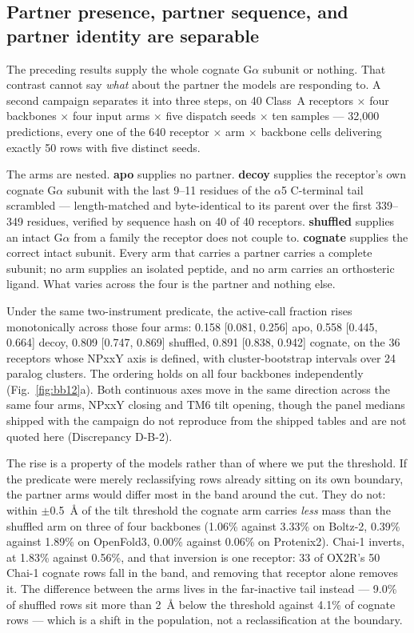\subsection*{Partner presence, partner sequence, and partner identity are separable}

The preceding results supply the whole cognate G$\alpha$ subunit or nothing. That
contrast cannot say \emph{what} about the partner the models are responding to.
A second campaign separates it into three steps, on 40 Class~A receptors $\times$
four backbones $\times$ four input arms $\times$ five dispatch seeds $\times$ ten
samples --- 32{,}000 predictions, every one of the 640 receptor $\times$ arm
$\times$ backbone cells delivering exactly 50 rows with five distinct seeds.

The arms are nested. \textbf{apo} supplies no partner. \textbf{decoy} supplies
the receptor's own cognate G$\alpha$ subunit with the last 9--11 residues of the
$\alpha$5 C-terminal tail scrambled --- length-matched and byte-identical to its
parent over the first 339--349 residues, verified by sequence hash on 40 of 40
receptors. \textbf{shuffled} supplies an intact G$\alpha$ from a family the
receptor does not couple to. \textbf{cognate} supplies the correct intact
subunit. Every arm that carries a partner carries a complete subunit; no arm
supplies an isolated peptide, and no arm carries an orthosteric ligand. What
varies across the four is the partner and nothing else.

Under the same two-instrument predicate, the active-call fraction rises
monotonically across those four arms: 0.158 [0.081, 0.256] apo, 0.558
[0.445, 0.664] decoy, 0.809 [0.747, 0.869] shuffled, 0.891 [0.838, 0.942]
cognate, on the 36 receptors whose NPxxY axis is defined, with cluster-bootstrap
intervals over 24 paralog clusters. The ordering holds on all four backbones
independently (Fig.~\ref{fig:bb12}a). Both continuous axes move in the same
direction across the same four arms, NPxxY closing and TM6 tilt opening, though
the panel medians shipped with the campaign do not reproduce from the shipped
tables and are not quoted here (Discrepancy D-B-2).

The rise is a property of the models rather than of where we put the threshold.
If the predicate were merely reclassifying rows already sitting on its own
boundary, the partner arms would differ most in the band around the cut. They do
not: within $\pm$0.5~\AA{} of the tilt threshold the cognate arm carries
\emph{less} mass than the shuffled arm on three of four backbones (1.06\%
against 3.33\% on Boltz-2, 0.39\% against 1.89\% on OpenFold3, 0.00\% against
0.06\% on Protenix2). Chai-1 inverts, at 1.83\% against 0.56\%, and that
inversion is one receptor: 33 of OX2R's 50 Chai-1 cognate rows fall in the band,
and removing that receptor alone removes it. The difference between the arms
lives in the far-inactive tail instead --- 9.0\% of shuffled rows sit more than
2~\AA{} below the threshold against 4.1\% of cognate rows --- which is a shift
in the population, not a reclassification at the boundary.

